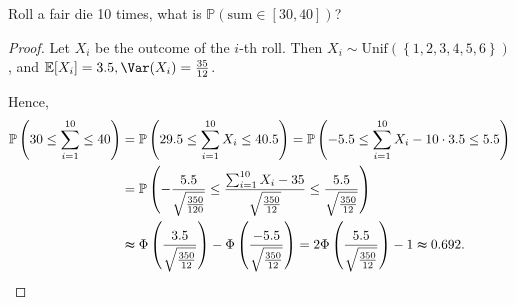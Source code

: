 \begin{eg}
    Roll a fair die 10 times, what is \(\mathbb{P} \left( \text{sum} \in [30, 40]  \right) \)? 
\end{eg}
\begin{proof}
    Let \(X_i\) be the outcome of the \(i\)-th roll. Then \(X_i \sim \mathrm{Unif}(\left\{1, 2, 3, 4, 5, 6 \right\} ) \), and \(\mathbb{E} [X_i] = 3.5, \Var(X_i) = \frac{35}{12}\). 

    Hence,
    \begin{align*}
        \mathbb{P} \left( 30 \le \sum_{i=1}^{10} \le 40   \right) &= \mathbb{P} \left( 29.5 \le \sum_{i=1}^{10} X_i \le 40.5   \right) = \mathbb{P} \left( -5.5 \le \sum_{i=1}^{10} X_i - 10 \cdot 3.5 \le 5.5   \right) \\
        &= \mathbb{P} \left( -\frac{5.5}{\sqrt{\frac{350}{120}} } \le \frac{\sum_{i=1}^{10} X_i - 35 }{\sqrt{\frac{350}{12}} } \le \frac{5.5}{\sqrt{\frac{350}{12}} }  \right) \\
        &\thickapprox \Phi \left( \frac{3.5}{\sqrt{\frac{350}{12}} } \right) - \Phi \left( \frac{-5.5}{\sqrt{\frac{350}{12}} } \right) = 2 \Phi \left( \frac{5.5}{\sqrt{\frac{350}{12}} } \right) - 1 \thickapprox 0.692.      
    \end{align*} 
\end{proof}